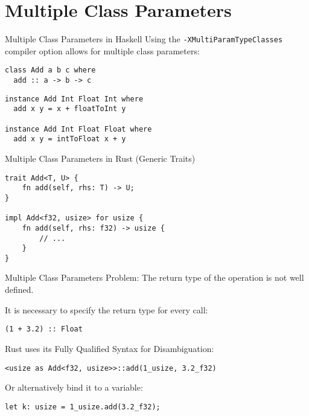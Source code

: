 \documentclass[
  english,            %
  aspectratio=169,    %
]{tumbeamer}
\begin{document}
\section{Multiple Class Parameters}

\begin{frame}[fragile]{Multiple Class Parameters in Haskell}
Using the \verb|-XMultiParamTypeClasses| compiler option allows for multiple class parameters:
\begin{verbatim}
class Add a b c where
  add :: a -> b -> c
\end{verbatim}

\pause \vspace{6mm}

\begin{verbatim}
instance Add Int Float Int where
  add x y = x + floatToInt y

instance Add Int Float Float where
  add x y = intToFloat x + y
\end{verbatim}
\end{frame}

\begin{frame}[fragile]{Multiple Class Parameters in Rust (Generic Traits)}
\begin{verbatim}
trait Add<T, U> {
    fn add(self, rhs: T) -> U;
}

impl Add<f32, usize> for usize {
    fn add(self, rhs: f32) -> usize {
        // ...
    }
}
\end{verbatim}
\end{frame}

\begin{frame}[fragile]{Multiple Class Parameters}
Problem: The return type of the operation is not well defined.

\vspace{6mm}

It is necessary to specify the return type for every call:
\begin{verbatim}
(1 + 3.2) :: Float
\end{verbatim}

\pause \vspace{6mm}

Rust uses its Fully Qualified Syntax for Disambiguation:
\begin{verbatim}
<usize as Add<f32, usize>>::add(1_usize, 3.2_f32)
\end{verbatim}

\pause \vspace{3mm}

Or alternatively bind it to a variable:
\begin{verbatim}
let k: usize = 1_usize.add(3.2_f32);
\end{verbatim}
\end{frame}
\end{document}
